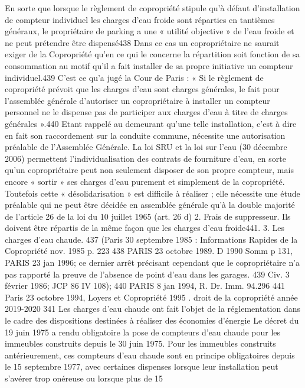 		En sorte que lorsque le règlement de copropriété stipule qu’à défaut d’installation de compteur individuel les charges d’eau froide sont réparties en tantièmes généraux, le propriétaire de parking a une « utilité objective » de l’eau froide et ne peut prétendre être dispensé438
		Dans ce cas un copropriétaire ne saurait exiger de la Copropriété qu'en ce qui le concerne la répartition soit fonction de sa consommation au motif qu'il a fait installer de sa propre initiative un compteur individuel.439 C’est ce qu’a jugé la Cour de Paris :
		« Si le règlement de copropriété prévoit que les charges d’eau sont charges générales, le fait pour l’assemblée générale d’autoriser un copropriétaire à installer un compteur personnel ne le dispense pas de participer aux charges d’eau à titre de charges générales ».440
		Etant rappelé au demeurant qu'une telle installation, c'est à dire en fait son raccordement sur la conduite commune, nécessite une autorisation préalable de l'Assemblée Générale.
		La loi SRU et la loi sur l’eau (30 décembre 2006) permettent l'individualisation des contrats de fourniture d'eau, en sorte qu’un copropriétaire peut non seulement disposer de son propre compteur, mais encore « sortir » ses charges d’eau purement et simplement de la copropriété. Toutefois cette « désolidarisation » est difficile à réaliser ; elle nécessite une étude préalable qui ne peut être décidée en assemblée générale qu’à la double majorité de l’article 26 de la loi du 10 juillet 1965 (art. 26 d)
		2. Frais de suppresseur.
		Ils doivent être répartis de la même façon que les charges d’eau froide441.
		3. Les charges d'eau chaude.
		437 (Paris 30 septembre 1985 : Informations Rapides de la Copropriété nov. 1985 p. 223
		438 PARIS 23 octobre 1989. D 1990 Somm p 131, PARIS 23 jan 1996; ce dernier arrêt précisant cependant que le copropriétaire n’a pas rapporté la preuve de l’absence de point d’eau dans les garages.
		439 Civ. 3 février 1986; JCP 86 IV 108);
		440 PARIS 8 jan 1994, R. Dr. Imm. 94.296
		441 Paris 23 octobre 1994, Loyers et Copropriété 1995 .
		droit de la copropriété année 2019-2020
		341
		Les charges d'eau chaude ont fait l'objet de la réglementation dans le cadre des dispositions destinées à réaliser des économies d'énergie
		Le décret du 19 juin 1975 a rendu obligatoire la pose de compteurs d'eau chaude pour les immeubles construits depuis le 30 juin 1975.
		Pour les immeubles construits antérieurement, ces compteurs d'eau chaude sont en principe obligatoires depuis le 15 septembre 1977, avec certaines dispenses lorsque leur installation peut s'avérer trop onéreuse ou lorsque plus de 15 %
